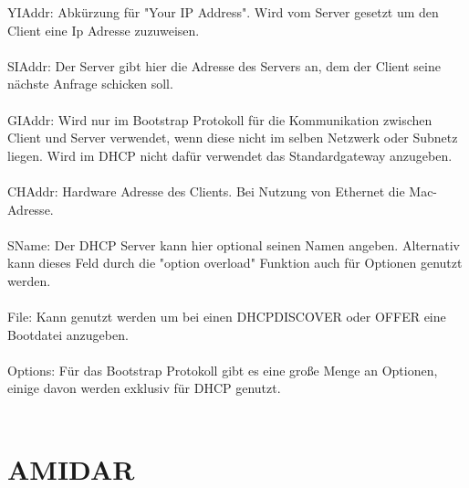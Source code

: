 YIAddr: Abkürzung für "Your IP Address". Wird vom Server gesetzt um den Client eine Ip Adresse zuzuweisen. \\\\
SIAddr: Der Server gibt hier die Adresse des Servers an, dem der Client seine nächste Anfrage schicken soll. \\\\
GIAddr: Wird nur im Bootstrap Protokoll für die Kommunikation zwischen Client und Server verwendet, wenn diese nicht im selben Netzwerk oder Subnetz liegen. Wird im DHCP nicht dafür verwendet das Standardgateway anzugeben. \\\\
CHAddr: Hardware Adresse des Clients. Bei Nutzung von Ethernet die Mac-Adresse. \\\\
SName: Der DHCP Server kann hier optional seinen Namen angeben. Alternativ kann dieses Feld durch die "option overload" Funktion auch für Optionen genutzt werden.\\\\
File: Kann genutzt werden um bei einen DHCPDISCOVER oder OFFER eine Bootdatei anzugeben. \\\\
Options: Für das Bootstrap Protokoll gibt es eine große Menge an Optionen, einige davon werden exklusiv für DHCP genutzt. \\\\



\section{AMIDAR}